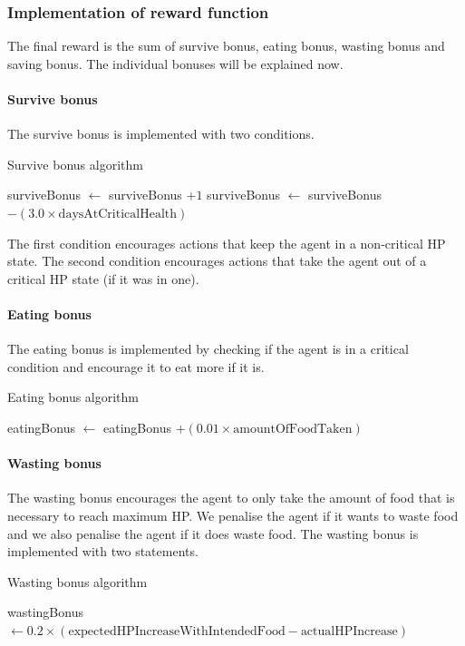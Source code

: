\subsubsection{Implementation of reward function}
The final reward is the sum of survive bonus, eating bonus, wasting bonus and saving bonus. The individual bonuses will be explained now.
\paragraph{Survive bonus}
The survive bonus is implemented with two conditions.

\begin{algorithm}[H]
\caption{Survive bonus algorithm}
\label{survivebonus-algorithm}
 {
surviveBonus $\gets$ surviveBonus $+1$\;
}{
surviveBonus $\gets$ surviveBonus $-(3.0\times\textrm{daysAtCriticalHealth})$\;
}
\end{algorithm}

The first condition encourages actions that keep the agent in a non-critical HP state. The second condition encourages actions that take the agent out of a critical HP state (if it was in one).
\paragraph{Eating bonus}
The eating bonus is implemented by checking if the agent is in a critical condition and encourage it to eat more if it is.

\begin{algorithm}[H]
\caption{Eating bonus algorithm}
\label{eatingbonus-algorithm}
 {
eatingBonus $\gets$ eatingBonus $+(0.01\times\textrm{amountOfFoodTaken})$\;
}
\end{algorithm}

\paragraph{Wasting bonus}
The wasting bonus encourages the agent to only take the amount of food that is necessary to reach maximum HP. We penalise the agent if it wants to waste food and we also penalise the agent if it does waste food. The wasting bonus is implemented with two statements.

\begin{algorithm}[H]
\caption{Wasting bonus algorithm}
\label{wastingbonus-algorithm}
wastingBonus $\gets 0.2\times(\textrm{expectedHPIncreaseWithIntendedFood}-\textrm{actualHPIncrease})$ 
\end{algorithm}

